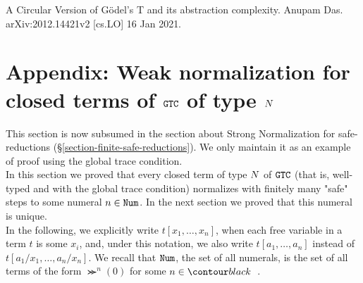 \documentclass{article}
\begin{document}
\sloppy 
{}





















\begin{thebibliography}{99}

A Circular Version of G\"{o}del's T and its abstraction complexity.
Anupam Das. arXiv:2012.14421v2 [cs.LO] 16 Jan 2021.

\end{thebibliography}

\newpage






\section{Appendix: Weak normalization for closed terms of ${\tt GTC}$ of type ${N}$}
\label{section-weak-normalization}
This section is now subsumed in the section about Strong Normalization for safe-reductions
(\S \ref{section-finite-safe-reductions}). We only maintain
it as an example of proof using the global trace condition.
\\

In this section we proved that every closed term of type ${N}$ of ${\tt GTC}$
 (that is, well-typed and with the global trace condition) normalizes with finitely many "safe" steps
to some numeral $n \in {\tt Num}$. In the next section we proved that this numeral is unique.
\\

In the following, we explicitly write $t[x_1,\ldots,x_n]$,
when each free variable in  a term $t$ is some $x_i$, 
and, under this notation, we also write $t[a_1,\ldots,a_n]$ instead of $t[a_1/x_1,\ldots,a_n/x_n]$. 
We recall that ${\tt Num}$, the set of all numerals, is the set of all terms of the form
$\Succ^n(0)$ for some $n\in \Nat$.
\end{document}
